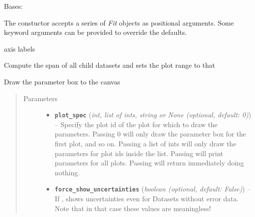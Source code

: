 \documentclass[a4paper,10pt,english]{sphinxmanual}
\begin{document}
\begin{fulllineitems}
\label{index:kafe.plot.Plot}
Bases: 

The constuctor accepts a series of \emph{Fit} objects as positional
arguments. Some keyword arguments can be provided to override
the defaults.

\begin{fulllineitems}
\label{index:kafe.plot.Plot.axis_labels}
axis labels

\end{fulllineitems}


\begin{fulllineitems}
\label{index:kafe.plot.Plot.compute_plot_range}
Compute the span of all child datasets and sets the plot range to that

\end{fulllineitems}


\begin{fulllineitems}
\label{index:kafe.plot.Plot.draw_fit_parameters_box}
Draw the parameter box to the canvas
\begin{quote}\begin{description}
\item[{Parameters}] \leavevmode\begin{itemize}
\item {} 
\textbf{\texttt{plot\_spec}} (\emph{int, list of ints, string or None (optional, default: 0)}) -- Specify the plot id of the plot for which to draw the parameters.
Passing 0 will only draw the parameter box for the first plot, and
so on. Passing a list of ints will only draw the parameters for
plot ids inside the list. Passing  will print parameters
for all plots. Passing  will return immediately doing
nothing.

\item {} 
\textbf{\texttt{force\_show\_uncertainties}} (\emph{boolean (optional, default: False)}) -- If , shows uncertainties even for Datasets without error
data. Note that in that case these values are meaningless!


\end{itemize}
\end{description}
\end{quote}
\end{fulllineitems}
\end{fulllineitems}
\end{document}
